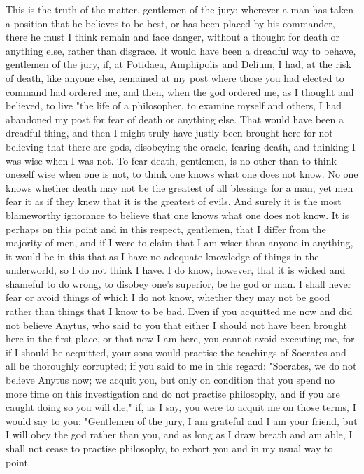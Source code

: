 This is the truth of the matter, gentlemen of the jury: wherever a man has taken a position that
he believes to be best, or has been placed by his commander, there he must I think remain and face
danger, without a thought for death or anything else, rather than disgrace. It would have been a
dreadful way to behave, gentlemen of the jury, if, at Potidaea, Amphipolis and Delium, I had, at
the risk of death, like anyone else, remained at my post where those you had elected to command
had ordered me, and then, when the god ordered me, as I thought and believed, to live "the life of
a philosopher, to examine myself and others, I had abandoned my post for fear of death or anything
else. That would have been a dreadful thing, and then I might truly have justly been brought here
for not believing that there are gods, disobeying the oracle, fearing death, and thinking I was wise
when I was not. To fear death, gentlemen, is no other than to think oneself wise when one is not,
to think one knows what one does not know. No one knows whether death may not be the greatest
of all blessings for a man, yet men fear it as if they knew that it is the greatest of evils. And surely
it is the most blameworthy ignorance to believe that one knows what one does not know. It is
perhaps on this point and in this respect, gentlemen, that I differ from the majority of men, and if
I were to claim that I am wiser than anyone in anything, it would be in this that as I have no
adequate knowledge of things in the underworld, so I do not think I have. I do know, however, that
it is wicked and shameful to do wrong, to disobey one's superior, be he god or man. I shall never
fear or avoid things of which I do not know, whether they may not be good rather than things that
I know to be bad. Even if you acquitted me now and did not believe Anytus, who said to you that
either I should not have been brought here in the first place, or that now I am here, you cannot
avoid executing me, for if I should be acquitted, your sons would practise the teachings of Socrates
and all be thoroughly corrupted; if you said to me in this regard: "Socrates, we do not believe
Anytus now; we acquit you, but only on condition that you spend no more time on this
investigation and do not practise philosophy, and if you are caught doing so you will die;" if, as
I say, you were to acquit me on those terms, I would say to you: "Gentlemen of the jury, I am
grateful and I am your friend, but I will obey the god rather than you, and as long as I draw breath
and am able, I shall not cease to practise philosophy, to exhort you and in my usual way to point
